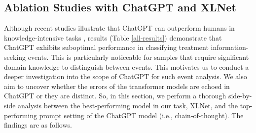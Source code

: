\documentclass[letterpaper]{article} %
\begin{document}
\subsection{Ablation Studies with ChatGPT and XLNet}
\label{ablation}
Although recent studies illustrate that ChatGPT can outperform humans in knowledge-intensive tasks \cite{Gilardi_2023}, results (Table \ref{all-results}) demonstrate that ChatGPT exhibits suboptimal performance in classifying treatment information-seeking events. This is particularly noticeable for samples that require significant domain knowledge to distinguish between events. This motivates us to conduct a deeper investigation into the scope of ChatGPT for such event analysis. We also aim to uncover whether the errors of the transformer models are echoed in ChatGPT or they are distinct. So, in this section, we perform a thorough side-by-side analysis between the best-performing model in our task, XLNet, and the top-performing prompt setting of the ChatGPT model (i.e., chain-of-thought). The findings are as follows.
\end{document}
